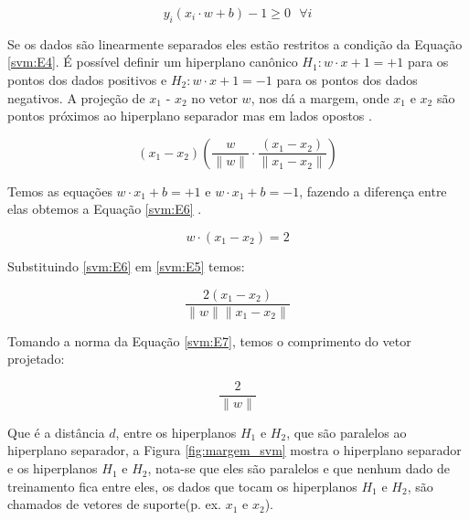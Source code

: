 \begin{equation}\label{svm:E4}
y_{i}(x_{i} \cdot w+b) - 1 \geq 0 \ \ \    \forall i
\end{equation}

Se os dados são linearmente separados eles estão restritos a condição da Equação \ref{svm:E4}. É possível definir um hiperplano canônico $H_{1}:w \cdot x + 1 = +1$ para os pontos dos dados positivos e $H_{2}:w \cdot x + 1 = -1$ para os pontos dos dados negativos. A projeção de $x_{1}$ - $x_{2}$ no vetor $w$, nos dá a margem, onde $x_{1}$ e $x_{2}$ são pontos próximos ao hiperplano separador mas em lados opostos \cite{Campbell2001}. 

\begin{equation}\label{svm:E5}
(x_{1} - x_{2})\left(\frac{w}{\parallel w \parallel} \cdot \frac{(x_{1} - x_{2})}{\parallel x_{1} - x_{2} \parallel} \right)
\end{equation}

Temos as equações $w \cdot x_{1} + b = +1$ e $w \cdot x_{1} + b = -1$, fazendo a diferença entre elas obtemos a Equação \ref{svm:E6} \cite{Hearst1998}. 

\begin{equation} \label{svm:E6}
w \cdot (x_{1} - x_{2}) = 2
\end{equation}

Substituindo \ref{svm:E6} em \ref{svm:E5} temos:

\begin{equation}\label{svm:E7}
\frac{2(x_{1}-x_{2})}{\parallel w \parallel \parallel x_{1}-x_{2} \parallel}
\end{equation}

Tomando a norma da Equação \ref{svm:E7}, temos o comprimento do vetor projetado:

\begin{equation} \label{svm:E8}
\frac{2}{\parallel w \parallel}
\end{equation}

Que é a distância $d$, entre os hiperplanos $H_{1}$ e $H_{2}$, que são paralelos ao hiperplano separador, a Figura \ref{fig:margem_svm} mostra o hiperplano separador e os hiperplanos $H_{1}$ e $H_{2}$, nota-se que eles são paralelos e que nenhum dado de treinamento fica entre eles, os dados que tocam os hiperplanos $H_{1}$ e $H_{2}$, são chamados de vetores de suporte(p. ex. $x_{1}$ e $x_{2}$).

